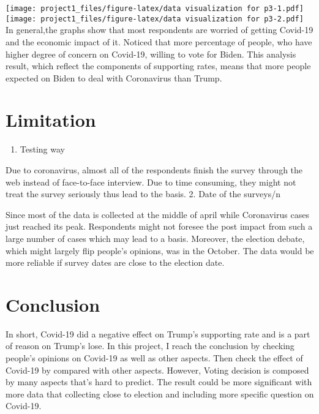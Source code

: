 \documentclass[
]{article}
\providecommand{\tightlist}{%
  \setlength{\itemsep}{0pt}\setlength{\parskip}{0pt}}
\begin{document}
\texttt{[image: project1\_files/figure-latex/data visualization for p3-1.pdf]}
\texttt{[image: project1\_files/figure-latex/data visualization for p3-2.pdf]}
In general,the graphs show that most respondents are worried of getting
Covid-19 and the economic impact of it. Noticed that more percentage of
people, who have higher degree of concern on Covid-19, willing to vote
for Biden. This analysis result, which reflect the components of
supporting rates, means that more people expected on Biden to deal with
Coronavirus than Trump.

\hypertarget{limitation}{%
\section{Limitation}\label{limitation}}

\begin{enumerate}
\def\labelenumi{\arabic{enumi}.}
\tightlist
\item
  Testing way
\end{enumerate}

Due to coronavirus, almost all of the respondents finish the survey
through the web instead of face-to-face interview. Due to time
consuming, they might not treat the survey seriously thus lead to the
basis. 2. Date of the surveys/n

Since most of the data is collected at the middle of april while
Coronavirus cases just reached its peak. Respondents might not foresee
the post impact from such a large number of cases which may lead to a
basis. Moreover, the election debate, which might largely flip people's
opinions, was in the October. The data would be more reliable if survey
dates are close to the election date.

\hypertarget{conclusion}{%
\section{Conclusion}\label{conclusion}}

In short, Covid-19 did a negative effect on Trump's supporting rate and
is a part of reason on Trump's lose. In this project, I reach the
conclusion by checking people's opinions on Covid-19 as well as other
aspects. Then check the effect of Covid-19 by compared with other
aspects. However, Voting decision is composed by many aspects that's
hard to predict. The result could be more significant with more data
that collecting close to election and including more specific question
on Covid-19.
\end{document}

